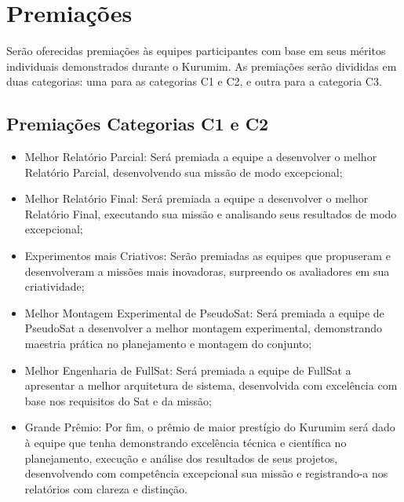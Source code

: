 \section{Premiações}
    \par Serão oferecidas premiações às equipes participantes com base em seus 
    méritos individuais demonstrados durante o Kurumim. As premiações serão divididas
    em duas categorias: uma para as categorias C1 e C2, e outra para a categoria C3.
    
    
    \subsection{Premiações Categorias C1 e C2}

        \begin{itemize}
            \item Melhor Relatório Parcial: Será premiada a equipe a desenvolver o 
            melhor Relatório Parcial, desenvolvendo sua missão de modo excepcional;
            \item Melhor Relatório Final: Será premiada a equipe a desenvolver o melhor 
            Relatório Final, executando sua missão e analisando seus resultados de modo 
            excepcional;
            \item Experimentos mais Criativos: Serão premiadas as equipes que propuseram 
            e desenvolveram a missões mais inovadoras, surpreendo os avaliadores em sua 
            criatividade;
            \item Melhor Montagem Experimental de PseudoSat: Será premiada a equipe de 
            PseudoSat a desenvolver a melhor montagem experimental, demonstrando maestria
            prática no planejamento e montagem do conjunto;
            \item Melhor Engenharia de FullSat: Será premiada a equipe de FullSat a 
            apresentar a melhor arquitetura de sistema, desenvolvida com excelência com 
            base nos requisitos do Sat e da missão;
            \item Grande Prêmio: Por fim, o prêmio de maior prestígio do Kurumim será 
            dado à equipe que tenha demonstrando excelência técnica e científica no 
            planejamento, execução e análise dos resultados de seus projetos, desenvolvendo
            com competência excepcional sua missão e registrando-a nos relatórios com 
            clareza e distinção. 
        \end{itemize}

